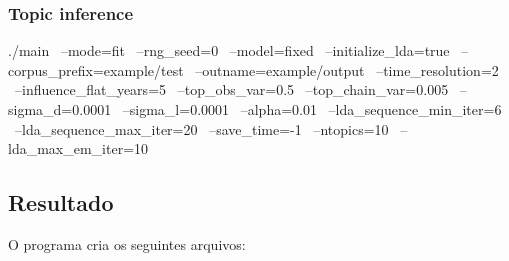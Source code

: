 \subsubsection{Topic inference}

./main \
    --mode=fit \
    --rng_seed=0 \
    --model=fixed \
    --initialize_lda=true \
    --corpus_prefix=example/test \
    --outname=example/output \
    --time_resolution=2 \
    --influence_flat_years=5 \
    --top_obs_var=0.5 \
    --top_chain_var=0.005 \
    --sigma_d=0.0001 \
    --sigma_l=0.0001 \
    --alpha=0.01 \
    --lda_sequence_min_iter=6 \
    --lda_sequence_max_iter=20 \
    --save_time=-1 \
    --ntopics=10 \
    --lda_max_em_iter=10



\subsection{Resultado}

O programa \srccode{dtm} cria os seguintes arquivos:

